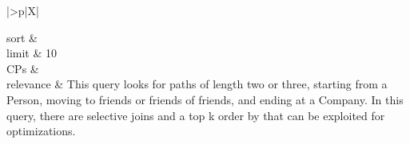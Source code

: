 \begin{tabularx}{\queryCardWidth}{|>{\queryPropertyCell}p{\queryPropertyCellWidth}|X|}
%
	
		sort		&
		\innerCardVSpace \\ \hline
	limit & 10 \\ \hline
	CPs &
	 \\ \hline
	relevance &
		\footnotesize This query looks for paths of length two or three, starting from a Person, moving to friends or friends of friends,
and ending at a Company. In this query, there are selective joins and a top k order by that can be exploited for
optimizations.
 \\ \hline%
\end{tabularx}
\queryCardVSpace

\let\emph\oldemph